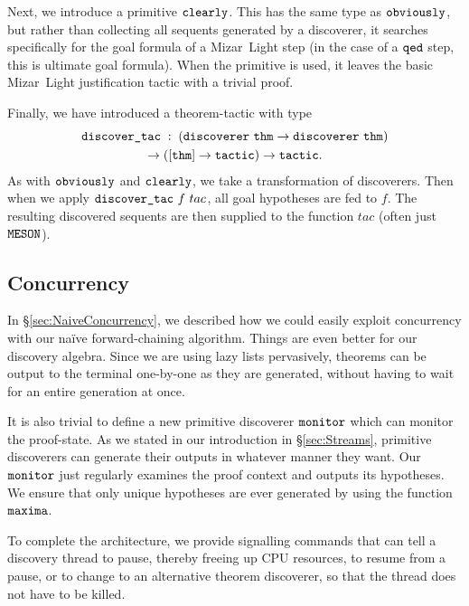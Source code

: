 Next, we introduce a primitive $\texttt{clearly}$. This has the same type as $\texttt{obviously}$, but rather than collecting all sequents generated by a discoverer, it searches specifically for the goal formula of a Mizar~Light step (in the case of a $\texttt{qed}$ step, this is ultimate goal formula). When the  primitive is used, it leaves the basic Mizar~Light justification tactic with a trivial proof.

\label{sec:DiscoverTac}
Finally, we have introduced a theorem-tactic  with type
\begin{multline*}
\code{discover\_tac}\;:\;(\code{discoverer}\ \code{thm}\rightarrow\code{discoverer} \ \code{thm}) \\\rightarrow ([\code{thm}] \rightarrow \code{tactic}) \rightarrow \code{tactic}.
\end{multline*}
As with $\texttt{obviously}$ and $\texttt{clearly}$, we take a transformation of discoverers. Then when we apply $\texttt{discover\_tac}\ f\ tac$,  all goal hypotheses are fed to $f$. The resulting discovered sequents are then supplied to the function $tac$ (often just $\texttt{MESON}$).

\subsection{Concurrency}
In \S\ref{sec:NaiveConcurrency}, we described how we could easily exploit concurrency with our na\"{i}ve forward-chaining algorithm. Things are even better for our discovery algebra. Since we are using lazy lists pervasively, theorems can be output to the terminal one-by-one as they are generated, without having to wait for an entire generation at once.

It is also trivial to define a new primitive discoverer $\texttt{monitor}$ which can monitor the proof-state. As we stated in our introduction in \S\ref{sec:Streams}, primitive discoverers can generate their outputs in whatever manner they want. Our $\texttt{monitor}$ just regularly examines the proof context and outputs its hypotheses. We ensure that only unique hypotheses are ever generated by using the function $\texttt{maxima}$.

To complete the architecture, we provide signalling commands that can tell a discovery thread to pause, thereby freeing up CPU resources, to resume from a pause, or to change to an alternative theorem discoverer, so that the thread does not have to be killed.


